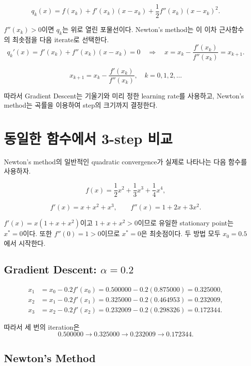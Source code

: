 \documentclass[11pt,a4paper]{article}
\begin{document}
\[
    q_k(x)
    =
    f(x_k)
    +
    f'(x_k)(x-x_k)
    +
    \frac12 f''(x_k)(x-x_k)^2.
\]

$f''(x_k)>0$이면 $q_k$는 위로 열린 포물선이다. Newton's method는 이 이차
근사함수의 최솟점을 다음 iterate로 선택한다.
\[
q_k'(x)= f'(x_k)+f''(x_k)(x-x_k)=0
\quad\Longrightarrow\quad
x=x_k-\frac{f'(x_k)}{f''(x_k)}
=x_{k+1}.
\]


\[
    \boxed{
    x_{k+1}
    =
    x_k-\frac{f'(x_k)}{f''(x_k)}, \quad k=0,1,2,\ldots
    }
\]

따라서 Gradient Descent는 기울기와 미리 정한 learning rate를 사용하고,
Newton's method는 곡률을 이용하여 step의 크기까지 결정한다.


\section{동일한 함수에서 3-step 비교}

Newton's method의 일반적인 quadratic convergence가 실제로 나타나는 다음 함수를 사용하자.

\[
    f(x)
    =
    \frac12 x^2+\frac13 x^3+\frac14 x^4,
\]

\[
    f'(x)=x+x^2+x^3,
    \qquad
    f''(x)=1+2x+3x^2.
\]

$f'(x)=x(1+x+x^2)$이고 $1+x+x^2>0$이므로 유일한 stationary point는
$x^*=0$이다. 또한 $f''(0)=1>0$이므로 $x^*=0$은 최솟점이다.
두 방법 모두 $x_0=0.5$에서 시작한다.

\subsection{Gradient Descent: $\alpha=0.2$}

\[
\begin{aligned}
x_1
&=x_0-0.2f'(x_0)
 =0.500000-0.2(0.875000)
 =0.325000,\\
x_2
&=x_1-0.2f'(x_1)
 =0.325000-0.2(0.464953)
 =0.232009,\\
x_3
&=x_2-0.2f'(x_2)
 =0.232009-0.2(0.298326)
 =0.172344.
\end{aligned}
\]

따라서 세 번의 iteration은
\[
0.500000
\longrightarrow
0.325000
\longrightarrow
0.232009
\longrightarrow
0.172344.
\]

\subsection{Newton's Method}
\end{document}
